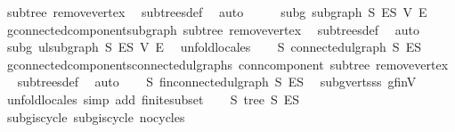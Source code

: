 \begin{isabellebody}
\ subtree\ remove{\isacharunderscore}{\kern0pt}vertex\ \isamarkupfalse%
\ subtrees{\isacharunderscore}{\kern0pt}def\ \isamarkupfalse%
\ auto\isanewline
\ \ \isamarkupfalse%
\ \isamarkupfalse%
\ subg{\isacharprime}{\kern0pt}{\isacharcolon}{\kern0pt}\ subgraph\ S\ E\isactrlsub S\ V{\isacharprime}{\kern0pt}\ E{\isacharprime}{\kern0pt}\ \isamarkupfalse%
\ g{\isacharprime}{\kern0pt}{\isachardot}{\kern0pt}connected{\isacharunderscore}{\kern0pt}component{\isacharunderscore}{\kern0pt}subgraph\ subtree\ remove{\isacharunderscore}{\kern0pt}vertex\ \isamarkupfalse%
\ subtrees{\isacharunderscore}{\kern0pt}def\ \isamarkupfalse%
\ auto\isanewline
\ \ \isamarkupfalse%
\ subg{\isacharprime}{\kern0pt}{\isacharcolon}{\kern0pt}\ ulsubgraph\ S\ E\isactrlsub S\ V{\isacharprime}{\kern0pt}\ E{\isacharprime}{\kern0pt}\ \isamarkupfalse%
\ unfold{\isacharunderscore}{\kern0pt}locales\isanewline
\ \ \isamarkupfalse%
\ S{\isacharcolon}{\kern0pt}\ connected{\isacharunderscore}{\kern0pt}ulgraph\ S\ E\isactrlsub S\ \isamarkupfalse%
\ g{\isacharprime}{\kern0pt}{\isachardot}{\kern0pt}connected{\isacharunderscore}{\kern0pt}components{\isacharunderscore}{\kern0pt}connected{\isacharunderscore}{\kern0pt}ulgraphs\ conn{\isacharunderscore}{\kern0pt}component\ subtree\ remove{\isacharunderscore}{\kern0pt}vertex\ \isamarkupfalse%
\ subtrees{\isacharunderscore}{\kern0pt}def\ \isamarkupfalse%
\ auto\isanewline
\ \ \isamarkupfalse%
\ S{\isacharcolon}{\kern0pt}\ fin{\isacharunderscore}{\kern0pt}connected{\isacharunderscore}{\kern0pt}ulgraph\ S\ E\isactrlsub S\ \isamarkupfalse%
\ subg{\isacharprime}{\kern0pt}{\isachardot}{\kern0pt}verts{\isacharunderscore}{\kern0pt}ss\ g{\isacharprime}{\kern0pt}{\isachardot}{\kern0pt}finV\ \isamarkupfalse%
\ unfold{\isacharunderscore}{\kern0pt}locales\ {\isacharparenleft}{\kern0pt}simp\ add{\isacharcolon}{\kern0pt}\ finite{\isacharunderscore}{\kern0pt}subset{\isacharparenright}{\kern0pt}\isanewline
\ \ \isamarkupfalse%
\ S{\isacharcolon}{\kern0pt}\ tree\ S\ E\isactrlsub S\ \isamarkupfalse%
\ subg{\isachardot}{\kern0pt}is{\isacharunderscore}{\kern0pt}cycle{}\ subg{\isacharprime}{\kern0pt}{\isachardot}{\kern0pt}is{\isacharunderscore}{\kern0pt}cycle{}\ no{\isacharunderscore}{\kern0pt}cycles\ \isamarkupfalse%

\end{isabellebody}
